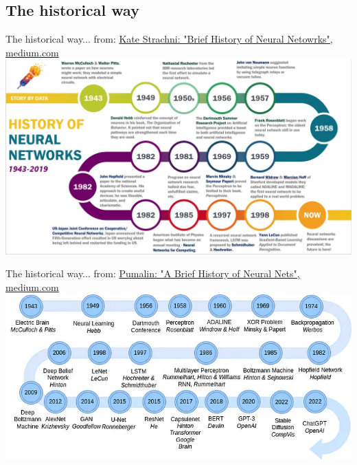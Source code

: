 \documentclass[10pt,serif,mathserif,compress,hyperref={colorlinks}]{beamer}
\begin{document}
\subsection{The historical way}

\begin{frame}{The historical way...}
  \hspace*{-2mm}from: \href{https://medium.com/analytics-vidhya/brief-history-of-neural-networks-44c2bf72eec}
    {Kate Strachni: "Brief History of Neural Netowrks", medium.com}\\[1mm]
  \hspace*{-8mm}\includegraphics[width=1.15\textwidth]{images/Brief History of NN - Kate Strachnyi.png}
\end{frame}

\begin{frame}{The historical way...}
  \hspace*{-2mm}from: \href{https://pub.towardsai.net/a-brief-history-of-neural-nets-472107bc2c9c}
    {Pumalin: "A Brief History of Neural Nets", medium.com}\\[1mm]
  \hspace*{-8mm}\includegraphics[width=1.15\textwidth]{images/A brief History of NN - Pumalin.png}
\end{frame}
\end{document}
